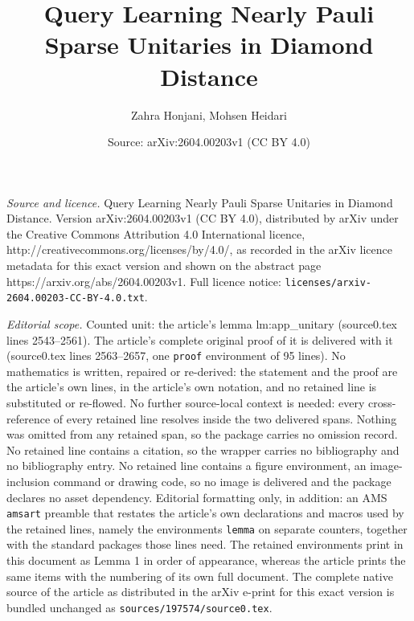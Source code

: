 \documentclass[10pt,a4paper]{amsart}
\title{Query Learning Nearly Pauli Sparse Unitaries in Diamond Distance}
\author{Zahra Honjani, Mohsen Heidari}
\date{Source: arXiv:2604.00203v1 (CC BY 4.0)}
\begin{document}
\maketitle

\noindent\emph{Source and licence.} Query Learning Nearly Pauli Sparse Unitaries in Diamond Distance. Version arXiv:2604.00203v1 (CC BY 4.0), distributed by arXiv under the Creative Commons Attribution 4.0 International licence, http://creativecommons.org/licenses/by/4.0/, as recorded in the arXiv licence metadata for this exact version and shown on the abstract page https://arxiv.org/abs/2604.00203v1. Full licence notice: \texttt{licenses/arxiv-2604.00203-CC-BY-4.0.txt}.\par\smallskip

\noindent\textit{Editorial scope.} Counted unit: the article's lemma lm:app\_unitary (source0.tex lines 2543--2561). The article's complete original proof of it is delivered with it (source0.tex lines 2563--2657, one \texttt{proof} environment of 95 lines). No mathematics is written, repaired or re-derived: the statement and the proof are the article's own lines, in the article's own notation, and no retained line is substituted or re-flowed.  No further source-local context is needed: every cross-reference of every retained line resolves inside the two delivered spans.  Nothing was omitted from any retained span, so the package carries no omission record.  No retained line contains a citation, so the wrapper carries no bibliography and no bibliography entry.  No retained line contains a figure environment, an image-inclusion command or drawing code, so no image is delivered and the package declares no asset dependency.  Editorial formatting only, in addition: an AMS \texttt{amsart} preamble that restates the article's own declarations and macros used by the retained lines, namely the environments \texttt{lemma} on separate counters, together with the standard packages those lines need.  The retained environments print in this document as Lemma 1 in order of appearance, whereas the article prints the same items with the numbering of its own full document.  The complete native source of the article as distributed in the arXiv e-print for this exact version is bundled unchanged as \texttt{sources/197574/source0.tex}.
\end{document}
